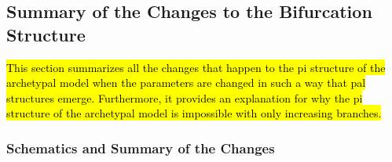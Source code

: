 \subsection{Summary of the Changes to the Bifurcation Structure}

\hl{
	This section summarizes all the changes that happen to the \gls{pi} structure of the archetypal model when the parameters are changed in such a way that \gls{pal} structures emerge.
	Furthermore, it provides an explanation for why the \gls{pi} structure of the archetypal model is impossible with only increasing branches.
}

\subsubsection{Schematics and Summary of the Changes}


